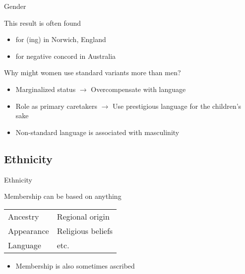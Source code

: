 \documentclass{beamer}
\newcommand{\subonefour}{Gender}
\newcommand{\subonefive}{Ethnicity}
\begin{document}
      \begin{frame}{\subonefour}
        \begin{block}{This result is often found}
          \begin{itemize}
            \item \textcite{trudgill_social_1974} for (ing) in Norwich, England
            \item \textcite{eisikovits_girl-talk/boy-talk:_1989} for negative concord in Australia
          \end{itemize}
        \end{block}
        \begin{block}{Why might women use standard variants more than men?}
          \begin{itemize}
            \item<2-> Marginalized status $\rightarrow$ Overcompensate with language
            \item<2-> Role as primary caretakers $\rightarrow$ Use prestigious language for the children's sake
            \item<2-> Non-standard language is associated with masculinity
          \end{itemize}
        \end{block}
      \end{frame}

    \subsection{\subonefive}
      \begin{frame}{\subonefive}
        \begin{definition}
          
        \end{definition}
        \begin{block}{Membership can be based on anything}
          \begin{tabular}{l l}
            Ancestry   & Regional origin \\
            Appearance & Religious beliefs \\
            Language   & etc.
          \end{tabular}
          \begin{itemize}
            \item Membership is also sometimes ascribed
          \end{itemize}
        \end{block}
      \end{frame}
\end{document}
